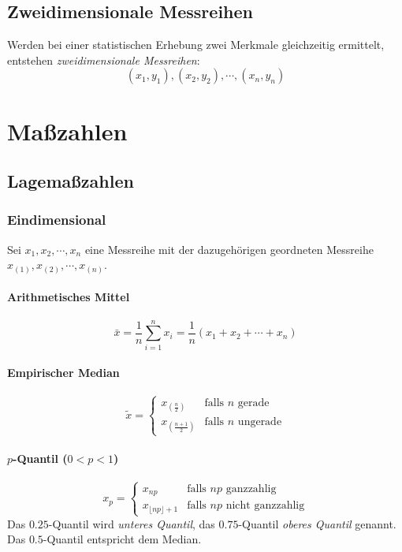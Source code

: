 		\subsection{Zweidimensionale Messreihen}
			Werden bei einer statistischen Erhebung zwei Merkmale gleichzeitig ermittelt, entstehen \textit{zweidimensionale Messreihen}:
			\begin{equation*}
				(x_1, y_1), (x_2, y_2), \cdots, (x_n, y_n)
			\end{equation*}

\section{Maßzahlen}
\subsection{Lagemaßzahlen}
\subsubsection{Eindimensional}
Sei \( x_1, x_2, \cdots, x_n \) eine Messreihe mit der dazugehörigen geordneten Messreihe \( x_{(1)}, x_{(2)}, \cdots, x_{(n)} \).

\paragraph{Arithmetisches Mittel}
\begin{equation*}
	\bar{x} = \frac{1}{n} \sum_{i=1}^n x_i = \frac{1}{n} (x_1 + x_2 + \cdots + x_n)
\end{equation*}

\paragraph{Empirischer Median}
\begin{equation*}
	\tilde{x} =
	\begin{cases}
		x_{(\frac{n}{2})}   & \textrm{falls } n \textrm{ gerade}   \\
		x_{(\frac{n+1}{2})} & \textrm{falls } n \textrm{ ungerade}
	\end{cases}
\end{equation*}

\paragraph{\(p\)-Quantil (\(0 < p < 1\))}
\begin{equation*}
	x_p =
	\begin{cases}
		x_{np}                     & \textrm{falls } np \textrm{ ganzzahlig}       \\
		x_{\lfloor np \rfloor + 1} & \textrm{falls } np \textrm{ nicht ganzzahlig}
	\end{cases}
\end{equation*}
Das \(0.25\)-Quantil wird \textit{unteres Quantil}, das \(0.75\)-Quantil \textit{oberes Quantil} genannt. Das \(0.5\)-Quantil entspricht dem Median.

